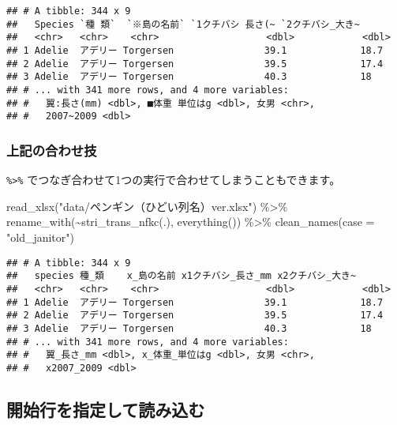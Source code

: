 \documentclass[
  xelatex,ja=standard, b5paper]{bxjsbook}
\newenvironment{Shaded}{\begin{snugshade}}{\end{snugshade}}
\newcommand{\AttributeTok}[1]{\textcolor[rgb]{0.77,0.63,0.00}{#1}}
\newcommand{\FunctionTok}[1]{\textcolor[rgb]{0.00,0.00,0.00}{#1}}
\newcommand{\NormalTok}[1]{#1}
\newcommand{\SpecialCharTok}[1]{\textcolor[rgb]{0.00,0.00,0.00}{#1}}
\newcommand{\StringTok}[1]{\textcolor[rgb]{0.31,0.60,0.02}{#1}}
\begin{document}
\begin{verbatim}
## # A tibble: 344 x 9
##   Species `種 類`  `※島の名前` `1クチバシ 長さ(~ `2クチバシ_大き~
##   <chr>   <chr>    <chr>                   <dbl>            <dbl>
## 1 Adelie  アデリー Torgersen                39.1             18.7
## 2 Adelie  アデリー Torgersen                39.5             17.4
## 3 Adelie  アデリー Torgersen                40.3             18  
## # ... with 341 more rows, and 4 more variables:
## #   翼:長さ(mm) <dbl>, ■体重 単位はg <dbl>, 女男 <chr>,
## #   2007~2009 <dbl>
\end{verbatim}

\newpage

\hypertarget{ux4e0aux8a18ux306eux5408ux308fux305bux6280}{%
\subsubsection{上記の合わせ技}\label{ux4e0aux8a18ux306eux5408ux308fux305bux6280}}

\texttt{\%\textgreater{}\%} でつなぎ合わせて1つの実行で合わせてしまうこともできます。

\begin{Shaded}
\begin{Highlighting}[]
\FunctionTok{read\_xlsx}\NormalTok{(}\StringTok{"data/ペンギン（ひどい列名）ver.xlsx"}\NormalTok{) }\SpecialCharTok{\%\textgreater{}\%} 
  \FunctionTok{rename\_with}\NormalTok{(}\SpecialCharTok{\textasciitilde{}}\FunctionTok{stri\_trans\_nfkc}\NormalTok{(.),}
              \FunctionTok{everything}\NormalTok{()) }\SpecialCharTok{\%\textgreater{}\%} 
    \FunctionTok{clean\_names}\NormalTok{(}\AttributeTok{case =} \StringTok{"old\_janitor"}\NormalTok{)}
\end{Highlighting}
\end{Shaded}

\begin{verbatim}
## # A tibble: 344 x 9
##   species 種_類    x_島の名前 x1クチバシ_長さ_mm x2クチバシ_大き~
##   <chr>   <chr>    <chr>                   <dbl>            <dbl>
## 1 Adelie  アデリー Torgersen                39.1             18.7
## 2 Adelie  アデリー Torgersen                39.5             17.4
## 3 Adelie  アデリー Torgersen                40.3             18  
## # ... with 341 more rows, and 4 more variables:
## #   翼_長さ_mm <dbl>, x_体重_単位はg <dbl>, 女男 <chr>,
## #   x2007_2009 <dbl>
\end{verbatim}

\hypertarget{ux958bux59cbux884cux3092ux6307ux5b9aux3057ux3066ux8aadux307fux8fbcux3080}{%
\subsection{開始行を指定して読み込む}\label{ux958bux59cbux884cux3092ux6307ux5b9aux3057ux3066ux8aadux307fux8fbcux3080}}
\end{document}
